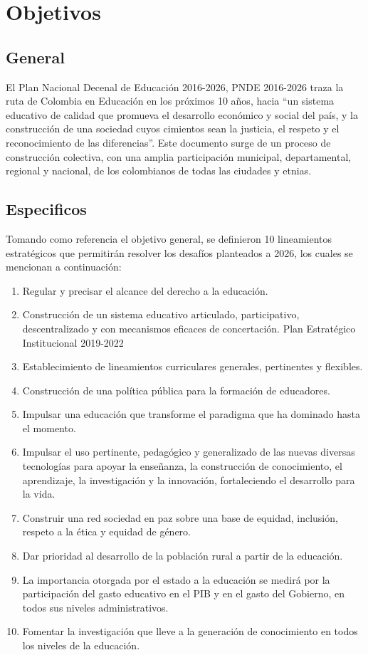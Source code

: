 \newpage
\section{Objetivos}

\subsection{General}
El Plan Nacional Decenal de Educación 2016-2026, PNDE 2016-2026 traza la ruta de Colombia en Educación en los próximos 10 años, hacia “un sistema educativo de calidad que promueva el desarrollo económico y social del país, y la construcción de una sociedad cuyos cimientos sean la justicia, el respeto y el reconocimiento de las diferencias”. Este documento surge de un proceso de construcción colectiva, con una amplia participación
municipal, departamental, regional y nacional, de los colombianos de todas las ciudades y etnias.

\subsection{Especificos}
Tomando como referencia el objetivo general, se definieron 10 lineamientos estratégicos que permitirán resolver los desafíos planteados a 2026, los cuales se
mencionan a continuación:

\begin{enumerate}
	\item Regular y precisar el alcance del derecho a la educación.
	\item Construcción de un sistema educativo articulado, participativo,
	descentralizado y con mecanismos eficaces de concertación.
	Plan Estratégico Institucional 2019-2022
	\item Establecimiento de lineamientos curriculares generales, pertinentes y flexibles.
	\item Construcción de una política pública para la formación de educadores.
	\item  Impulsar una educación que transforme el paradigma que ha dominado hasta el momento.
	\item Impulsar el uso pertinente, pedagógico y generalizado de las nuevas diversas tecnologías para apoyar la enseñanza, la construcción de conocimiento, el aprendizaje, la investigación y la innovación, fortaleciendo el desarrollo para la vida.
	\item Construir una red sociedad en paz sobre una base de equidad, inclusión, respeto a la ética y equidad de género.
	\item Dar prioridad al desarrollo de la población rural a partir de la educación.
	\item La importancia otorgada por el estado a la educación se medirá por
	la participación del gasto educativo en el PIB y en el gasto del Gobierno, en todos sus niveles administrativos.
	\item Fomentar la investigación que lleve a la generación de conocimiento en todos los niveles de la educación.
\end{enumerate}


